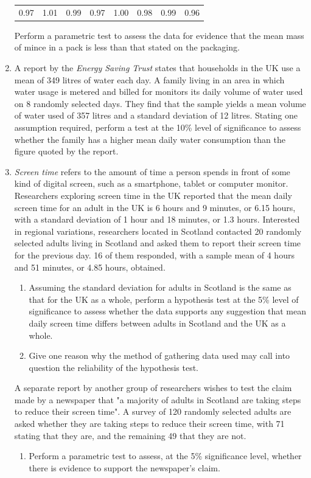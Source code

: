 \documentclass[
  11pt,
]{book}
\begin{document}
\begin{enumerate}
\begin{center}
\begin{tabular}{cccccccc}
    0.97 & 1.01 & 0.99 & 0.97 & 1.00 & 0.98 & 0.99 & 0.96
    \end{tabular}
    \end{center}
    Perform a parametric test to assess the data for evidence that the mean mass of mince in a pack is less than that stated on the packaging.
    \item A report by the \textit{Energy Saving Trust} states that households in the UK use a mean of 349 litres of water each day. A family living in an area in which water usage is metered and billed for monitors its daily volume of water used on 8 randomly selected days. They find that the sample yields a mean volume of water used of 357 litres and a standard deviation of 12 litres. Stating one assumption required, perform a test at the 10\% level of significance to assess whether the family has a higher mean daily water consumption than the figure quoted by the report.
    \item \textit{Screen time} refers to the amount of time a person spends in front of some kind of digital screen, such as a smartphone, tablet or computer monitor. Researchers exploring screen time in the UK reported that the mean daily screen time for an adult in the UK is 6 hours and 9 minutes, or 6.15 hours, with a standard deviation of 1 hour and 18 minutes, or 1.3 hours. Interested in regional variations, researchers located in Scotland contacted 20 randomly selected adults living in Scotland and asked them to report their screen time for the previous day. 16 of them responded, with a sample mean of 4 hours and 51 minutes, or 4.85 hours, obtained.
    \begin{enumerate}
        \item Assuming the standard deviation for adults in Scotland is the same as that for the UK as a whole, perform a hypothesis test at the 5\% level of significance to assess whether the data supports any suggestion that mean daily screen time differs between adults in Scotland and the UK as a whole.
        \item Give one reason why the method of gathering data used may call into question the reliability of the hypothesis test.
    \end{enumerate}
    A separate report by another group of researchers wishes to test the claim made by a newspaper that "a majority of adults in Scotland are taking steps to reduce their screen time". A survey of 120 randomly selected adults are asked whether they are taking steps to reduce their screen time, with 71 stating that they are, and the remaining 49 that they are not.
    \begin{enumerate}[resume]
        \item Perform a parametric test to assess, at the 5\% significance level, whether there is evidence to support the newspaper's claim.
    \end{enumerate}
\end{enumerate}
\end{document}
